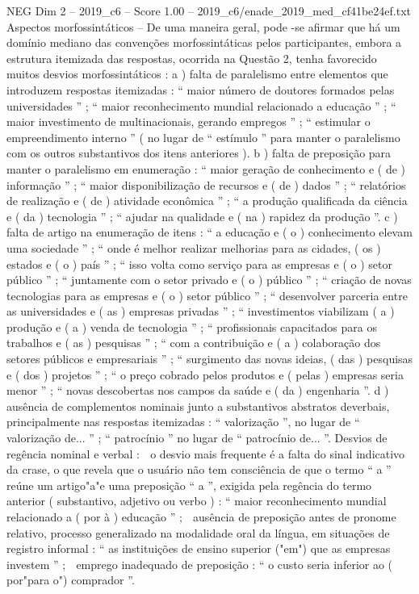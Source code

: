 \begin{textsample}{NEG Dim 2 – 2019\_c6 – Score 1.00 – 2019\_c6/enade\_2019\_med\_cf41be24ef.txt}
Aspectos morfossintáticos – De uma maneira geral, pode -se afirmar que há um domínio mediano das convenções morfossintáticas pelos participantes, embora a estrutura itemizada das respostas, ocorrida na Questão 2, tenha favorecido muitos desvios morfossintáticos : a ) falta de paralelismo entre elementos que introduzem respostas itemizadas : “ maior número de doutores formados pelas universidades ” ; “ maior reconhecimento mundial relacionado a educação ” ; “ maior investimento de multinacionais, gerando empregos ” ; “ estimular o empreendimento interno ” ( no lugar de “ estímulo ” para manter o paralelismo com os outros substantivos dos itens anteriores ). b ) falta de preposição para manter o paralelismo em enumeração : “ maior geração de conhecimento e ( de ) informação ” ; “ maior disponibilização de recursos e ( de ) dados ” ; “ relatórios de realização e ( de ) atividade econômica ” ; “ a produção qualificada da ciência e ( da ) tecnologia ” ; “ ajudar na qualidade e ( na ) rapidez da produção ”. c ) falta de artigo na enumeração de itens : “ a educação e ( o ) conhecimento elevam uma sociedade ” ; “ onde é melhor realizar melhorias para as cidades, ( os ) estados e ( o ) país ” ; “ isso volta como serviço para as empresas e ( o ) setor público ” ; “ juntamente com o setor privado e ( o ) público ” ; “ criação de novas tecnologias para as empresas e ( o ) setor público ” ; “ desenvolver parceria entre as universidades e ( as ) empresas privadas ” ; “ investimentos viabilizam ( a ) produção e ( a ) venda de tecnologia ” ; “ profissionais capacitados para os trabalhos e ( as ) pesquisas ” ; “ com a contribuição e ( a ) colaboração dos setores públicos e empresariais ” ; “ surgimento das novas ideias, ( das ) pesquisas e ( dos ) projetos ” ; “ o preço cobrado pelos produtos e ( pelas ) empresas seria menor ” ; “ novas descobertas nos campos da saúde e ( da ) engenharia ”. d ) ausência de complementos nominais junto a substantivos abstratos deverbais, principalmente nas respostas itemizadas : “ valorização ”, no lugar de “ valorização de... ” ; “ patrocínio ” no lugar de “ patrocínio de... ”.
Desvios de regência nominal e verbal :  o desvio mais frequente é a falta do sinal indicativo da crase, o que revela que o usuário não tem consciência de que o termo “ a ” reúne um artigo"a"e uma preposição “ a ”, exigida pela regência do termo anterior ( substantivo, adjetivo ou verbo ) : “ maior reconhecimento mundial relacionado a ( por à ) educação ” ;  ausência de preposição antes de pronome relativo, processo generalizado na modalidade oral da língua, em situações de registro informal : “ as instituições de ensino superior ("em") que as empresas investem ” ;  emprego inadequado de preposição : “ o custo seria inferior ao ( por"para o") comprador ”.

\end{textsample}
